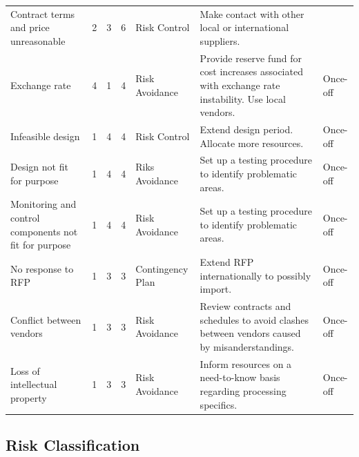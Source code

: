 \begin{landscape}
\begin{table}[H]
{\begin{tabular}{lllllll}
Contract terms and price unreasonable & 2 & 3 & \cellcolor[HTML]{F8FF00}6 & Risk Control & Make contact with other local or international suppliers. &  \\
Exchange rate & 4 & 1 & \cellcolor[HTML]{34FF34}4 & Risk Avoidance & Provide reserve fund for cost increases associated with exchange rate instability. Use local vendors. & Once-off \\
Infeasible design & 1 & 4 & \cellcolor[HTML]{34FF34}4 & Risk Control & Extend design period. Allocate more resources. & Once-off \\
Design not fit for purpose & 1 & 4 & \cellcolor[HTML]{34FF34}4 & Riks Avoidance & Set up a testing procedure to identify problematic areas. & Once-off \\
Monitoring and control components not fit for purpose & 1 & 4 & \cellcolor[HTML]{34FF34}4 & Risk Avoidance & Set up a testing procedure to identify problematic areas. & Once-off \\
No response to RFP & 1 & 3 & \cellcolor[HTML]{34FF34}3 & Contingency Plan & Extend RFP internationally to possibly import. & Once-off \\
Conflict between vendors & 1 & 3 & \cellcolor[HTML]{34FF34}3 & Risk Avoidance & Review contracts and schedules to avoid clashes between vendors caused by misanderstandings. & Once-off \\
Loss of intellectual property & 1 & 3 & \cellcolor[HTML]{34FF34}3 & Risk Avoidance & Inform resources on a need-to-know basis regarding processing specifics. & Once-off
\end{tabular}%
}
\end{table}

\end{landscape}

\subsection{Risk Classification}

